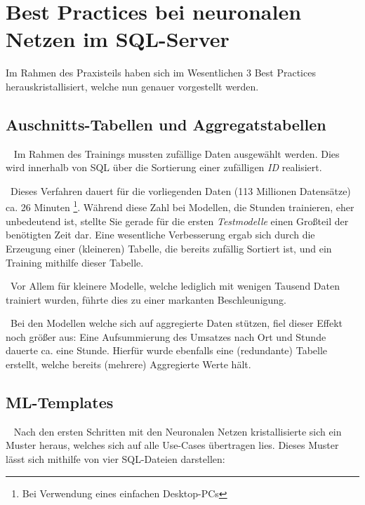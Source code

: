 \section[Best Practices]{Best Practices bei neuronalen Netzen im SQL-Server}

Im Rahmen des Praxisteils haben sich im Wesentlichen 3 Best Practices herauskristallisiert, welche nun genauer vorgestellt werden. 

\subsection{Auschnitts-Tabellen und Aggregatstabellen} ~\newline
Im Rahmen des Trainings mussten zufällige Daten ausgewählt werden. Dies wird innerhalb von SQL über die Sortierung einer zufälligen \textit{ID} realisiert. 

~\newline Dieses Verfahren dauert für die vorliegenden Daten (113 Millionen Datensätze) ca. 26 Minuten \footnote{Bei Verwendung eines einfachen Desktop-PCs}. Während diese Zahl bei Modellen, die Stunden trainieren, eher unbedeutend ist, stellte Sie gerade für die ersten \textit{Testmodelle} einen Großteil der benötigten Zeit dar. Eine wesentliche Verbesserung ergab sich durch die Erzeugung einer (kleineren) Tabelle, die bereits zufällig Sortiert ist, und ein Training mithilfe dieser Tabelle. 

~\newline Vor Allem für kleinere Modelle, welche lediglich mit wenigen Tausend Daten trainiert wurden, führte dies zu einer markanten Beschleunigung.

~\newline Bei den Modellen welche sich auf aggregierte Daten stützen, fiel dieser Effekt noch größer aus: Eine Aufsummierung des Umsatzes nach Ort und Stunde dauerte ca. eine Stunde. Hierfür wurde ebenfalls eine (redundante) Tabelle erstellt, welche bereits (mehrere) Aggregierte Werte hält. 

\subsection{ML-Templates} ~\newline
Nach den ersten Schritten mit den Neuronalen Netzen kristallisierte sich ein Muster heraus, welches sich auf alle Use-Cases übertragen lies. Dieses Muster lässt sich mithilfe von vier SQL-Dateien darstellen:

